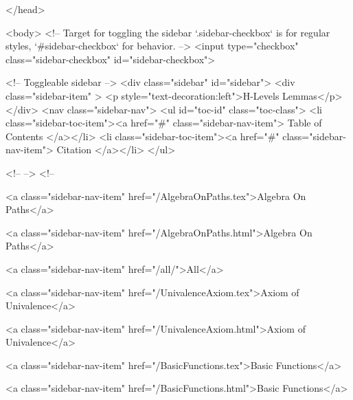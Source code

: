   
</head>




  <body>
    <!-- Target for toggling the sidebar `.sidebar-checkbox` is for regular
     styles, `#sidebar-checkbox` for behavior. -->
<input type="checkbox" class="sidebar-checkbox" id="sidebar-checkbox">

<!-- Toggleable sidebar -->
<div class="sidebar" id="sidebar">
  <div class="sidebar-item" >
    <p style="text-decoration:left">H-Levels Lemmas</p>
  </div>
  <nav class="sidebar-nav">
    <ul id="toc-id" class="toc-class">
  <li class="sidebar-toc-item"><a href="#" class="sidebar-nav-item"> Table of Contents </a></li>
  <li class="sidebar-toc-item"><a href="#" class="sidebar-nav-item"> Citation </a></li>
</ul>


    <!--  -->
    <!-- 
      
    
      
    
      
    
      
        
      
    
      
        
          <a class="sidebar-nav-item" href="/AlgebraOnPaths.tex">Algebra On Paths</a>
        
      
    
      
        
          <a class="sidebar-nav-item" href="/AlgebraOnPaths.html">Algebra On Paths</a>
        
      
    
      
        
          <a class="sidebar-nav-item" href="/all/">All</a>
        
      
    
      
        
          <a class="sidebar-nav-item" href="/UnivalenceAxiom.tex">Axiom of Univalence</a>
        
      
    
      
        
          <a class="sidebar-nav-item" href="/UnivalenceAxiom.html">Axiom of Univalence</a>
        
      
    
      
        
          <a class="sidebar-nav-item" href="/BasicFunctions.tex">Basic Functions</a>
        
      
    
      
        
          <a class="sidebar-nav-item" href="/BasicFunctions.html">Basic Functions</a>
        
